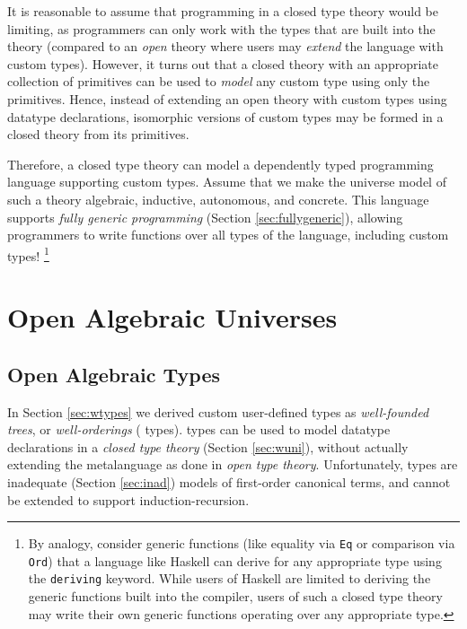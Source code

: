 \documentclass[12pt]{report}
\newcommand{\refsec}[1]{Section \ref{sec:#1}}
\newcommand{\AgdaData}[1]{\AgdaDatatype{#1}}
\theoremstyle{definition}
\theoremstyle{remark}
\numberwithin{definition}{section}
\numberwithin{equation}{section}
\numberwithin{proposition}{section}
\numberwithin{conjecture}{section}
\numberwithin{theorem}{section}
\numberwithin{lemma}{section}
\numberwithin{corollary}{section}
\numberwithin{example}{section}
\numberwithin{remark}{section}
\begin{document}
It is reasonable to assume that programming in a closed type theory
would be limiting, as programmers can only work with the types that
are built into the theory (compared to an \textit{open} theory where
users may \textit{extend} the language with custom types).
However, it turns out that a closed theory with an appropriate
collection of primitives can be used to \textit{model} any custom type
using only the primitives. Hence, instead of extending an open theory
with custom types using datatype declarations,
isomorphic versions of custom types
may be formed in a closed theory from its primitives.

Therefore, a closed type theory can model a dependently typed
programming language supporting custom types. Assume that we make
the universe model of such a theory algebraic, inductive, autonomous,
and concrete. This language supports
\textit{fully generic programming} (\refsec{fullygeneric}), allowing
programmers to write functions over all types of the
language, including custom types!
\footnote{By analogy, consider generic functions
  (like equality via \texttt{Eq} or comparison via \texttt{Ord})
  that a language like
  Haskell can derive for any appropriate type using the
  \texttt{deriving} keyword. While users of Haskell are limited to
  deriving the generic functions built into the compiler, users of
  such a closed type theory may write their own generic functions
  operating over any appropriate type.
}



\part{Open Algebraic Universes}\label{part:open}

\chapter{Open Algebraic Types}\label{ch:open}

In \refsec{wtypes} we derived custom user-defined types as
\textit{well-founded trees}, or
\textit{well-orderings} (\AgdaData{W} types). \AgdaData{W} types
can be used to model
datatype declarations
in a \textit{closed type theory} (\refsec{wuni}),
without actually extending the metalanguage as done in
\textit{open type theory}. Unfortunately, \AgdaData{W} types are
inadequate (\refsec{inad}) models of first-order canonical terms, and
cannot be extended to support induction-recursion.
\end{document}
